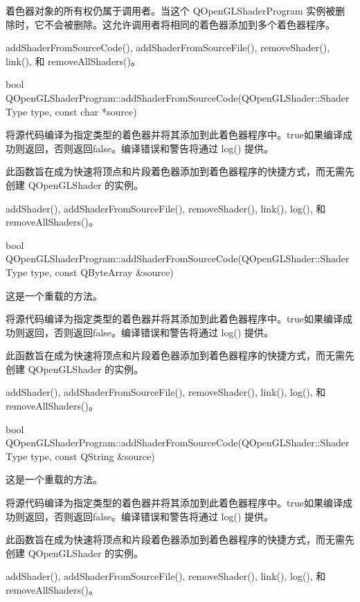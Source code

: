 着色器对象的所有权仍属于调用者。当这个 QOpenGLShaderProgram 实例被删除时，它不会被删除。这允许调用者将相同的着色器添加到多个着色器程序。

\begin{seeAlso}
addShaderFromSourceCode(), addShaderFromSourceFile(), removeShader(), link(), 和 removeAllShaders()。
\end{seeAlso}

bool QOpenGLShaderProgram::addShaderFromSourceCode(QOpenGLShader::ShaderType type, const char *source)

将源代码编译为指定类型的着色器并将其添加到此着色器程序中。true如果编译成功则返回，否则返回false。编译错误和警告将通过 log() 提供。

此函数旨在成为快速将顶点和片段着色器添加到着色器程序的快捷方式，而无需先创建 QOpenGLShader 的实例。


\begin{seeAlso}
addShader(), addShaderFromSourceFile(), removeShader(), link(), log(), 和removeAllShaders()。
\end{seeAlso}

bool QOpenGLShaderProgram::addShaderFromSourceCode(QOpenGLShader::ShaderType type, const QByteArray \&source)

这是一个重载的方法。

将源代码编译为指定类型的着色器并将其添加到此着色器程序中。true如果编译成功则返回，否则返回false。编译错误和警告将通过 log() 提供。

此函数旨在成为快速将顶点和片段着色器添加到着色器程序的快捷方式，而无需先创建 QOpenGLShader 的实例。


\begin{seeAlso}
addShader(), addShaderFromSourceFile(), removeShader(), link(), log(), 和 removeAllShaders()。
\end{seeAlso}

bool QOpenGLShaderProgram::addShaderFromSourceCode(QOpenGLShader::ShaderType type, const QString \&source)

这是一个重载的方法。

将源代码编译为指定类型的着色器并将其添加到此着色器程序中。true如果编译成功则返回，否则返回false。编译错误和警告将通过 log() 提供。

此函数旨在成为快速将顶点和片段着色器添加到着色器程序的快捷方式，而无需先创建 QOpenGLShader 的实例。

\begin{seeAlso}
addShader(), addShaderFromSourceFile(), removeShader(), link(), log(), 和removeAllShaders()。
\end{seeAlso}

